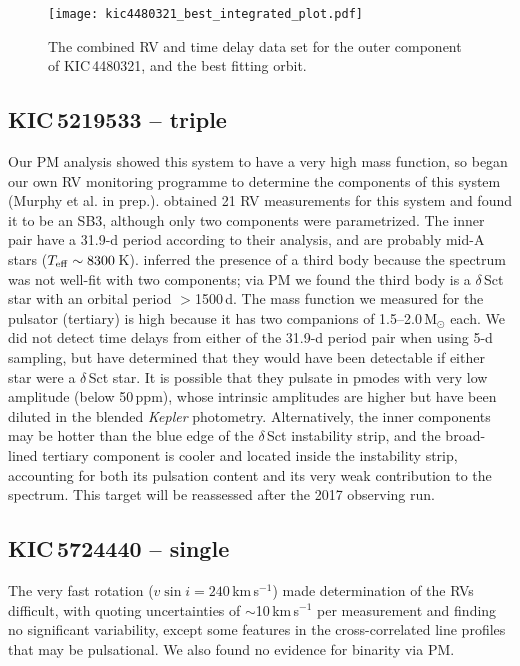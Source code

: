 \documentclass[a4paper,fleqn,usenatbib]{mnras}
\begin{document}
\begin{figure}
\begin{center}
\texttt{[image: kic4480321\_best\_integrated\_plot.pdf]}
\caption{The combined RV and time delay data set for the outer component of KIC\,4480321, and the best fitting orbit.}
\label{fig:4480321}
\end{center}
\end{figure}


\subsection{KIC\,5219533 -- triple}
Our PM analysis showed this system to have a very high mass function, so began our own RV monitoring programme to determine the components of this system (Murphy et al. in prep.). %
\citeauthor{lampensetal2017} obtained 21 RV measurements for this system and found it to be an SB3, although only two components were parametrized. The inner pair have a 31.9-d period according to their analysis, and are probably mid-A stars ($T_{\rm eff} \sim 8300$\,K). \citeauthor{lampensetal2017} inferred the presence of a third body because the spectrum was not well-fit with two components; via PM we found the third body is a $\delta$\,Sct star with an orbital period $>$1500\,d. The mass function we measured for the pulsator (tertiary) is high because it has two companions of 1.5--2.0\,M$_{\odot}$ each. We did not detect time delays from either of the 31.9-d period pair when using 5-d sampling, but have determined that they would have been detectable if either star were a $\delta$\,Sct star. It is possible that they pulsate in p\:modes with very low amplitude (below 50\,ppm), whose intrinsic amplitudes are higher but have been diluted in the blended \textit{Kepler} photometry. Alternatively, the inner components may be hotter than the blue edge of the $\delta$\,Sct instability strip, and the broad-lined tertiary component is cooler and located inside the instability strip, accounting for both its pulsation content and its very weak contribution to the spectrum. This target will be reassessed after the 2017 observing run.


\subsection{KIC\,5724440 -- single}
The very fast rotation ($v\sin i = 240$\,km\,s$^{-1}$) made determination of the RVs difficult, with \citeauthor{lampensetal2017} quoting uncertainties of $\sim$10\,km\,s$^{-1}$ per measurement and finding no significant variability, except some features in the cross-correlated line profiles that may be pulsational. We also found no evidence for binarity via PM.
\end{document}
